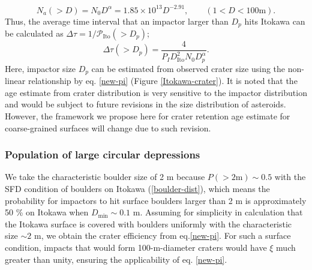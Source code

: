 \documentclass[3p,authoryear]{elsarticle}
\begin{document}
\begin{equation}
	N_a(>D)=N_0D^{\alpha}=1.85\times 10^{13}D^{-2.91},\qquad (1<D<100\text{m}).
\end{equation}
Thus, the average time interval that an impactor larger than $D_p$ hits Itokawa can be calculated as $\Delta \tau =1/\mathcal{P}_\text{Ito}(>D_p)$;
\begin{equation}
	\Delta \tau(>D_p) = \frac{4}{P_ID_\text{Ito}^2N_0 D_p^{\alpha}}.
\end{equation}
Here, impactor size $D_p$ can be estimated from observed crater size using the non-linear relationship by eq. \eqref{new-pi} (Figure \ref{Itokawa-crater}).
It is noted that the age estimate from crater distribution is very sensitive to the impactor distribution and would be subject to future revisions in the size distribution of asteroids. However, the framework we propose here for crater retention age estimate for coarse-grained surfaces will change due to such revision.

\subsubsection{Population of large circular depressions}
We take the characteristic boulder size of 2 m because $P(>2 \text{m})\sim 0.5$ with the SFD condition of boulders on Itokawa (\ref{boulder-dist}), which means the probability for impactors to hit surface boulders larger than 2 m is approximately 50 \% on Itokawa when $D_\text{min} \sim 0.1$ m.
Assuming for simplicity in calculation that the Itokawa surface is covered with boulders uniformly with the characteristic size $\sim2$ m, we obtain the crater efficiency from eq.\eqref{new-pi}.
For such a surface condition, impacts that would form 100-m-diameter craters would have $\xi$ much greater than unity, ensuring the applicability of eq. \eqref{new-pi}.
\end{document}
